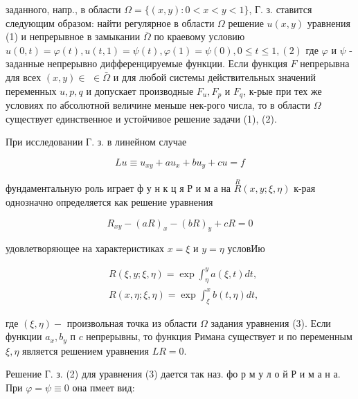 \documentclass[10pt]{article}
\begin{document}
заданного, напр., в области $\Omega=\{(x, y): 0<x<y<1\}$, Г. з. ставится следующим образом: найти регулярное в области $\Omega$ решение $u(x, y)$ уравнения (1) и непрерывное в замыкании $\bar{\Omega}$ по краевому условию $u(0, t)=\varphi(t), u(t, 1)=\psi(t), \varphi(1)=\psi(0), 0 \leqslant t \leqslant 1,(2)$ где $\varphi$ и $\psi$ - заданные непрерывно дифференцируемые функции. Если функция $F$ непрерывна для всех $(x, y) \in$ $\in \bar{\Omega}$ и для любой системы действительных значений переменных $u, p, q$ и допускает производные $F_{u}, F_{p}$ и $F_{q}$, к-рые при тех же условиях по абсолютной величине меньше нек-рого числа, то в области $\Omega$ существует единственное и устойчивое решение задачи (1), (2).



При исследовании Г. з. в линейном случае



\[

L u \equiv u_{x y}+a u_{x}+b u_{y}+c u=f

\]



фундаментальную роль играет ф у н к ц я Р и м а на $\stackrel{R}{R}(x, y ; \xi, \eta)$ к-рая однозначно определяется как решение уравнения



\[

R_{x y}-(a R)_{x}-(b R)_{y}+c R=0

\]



удовлетворяющее на характеристиках $x=\xi$ и $y=\eta$ условИю



\[

\begin{aligned}

& R(\xi, y ; \xi, \eta)=\exp \int_{\eta}^{y} a(\xi, t) d t, \\

& R(x, \eta ; \xi, \eta)=\exp \int_{\xi}^{x} b(t, \eta) d t,

\end{aligned}

\]



где $(\xi, \eta)-$ произвольная точка из области $\Omega$ задания уравнения (3). Если функции $a_{x}, b_{y}$ п $c$ непрерывны, то функция Римана существует и по переменным $\xi, \eta$ является решением уравнения $L R=0$.



Решение Г. з. (2) для уравнения (3) дается так наз. $ф о$ р м у л о й Р и м а н а. При $\varphi=\psi \equiv 0$ она пмеет вид:
\end{document}
